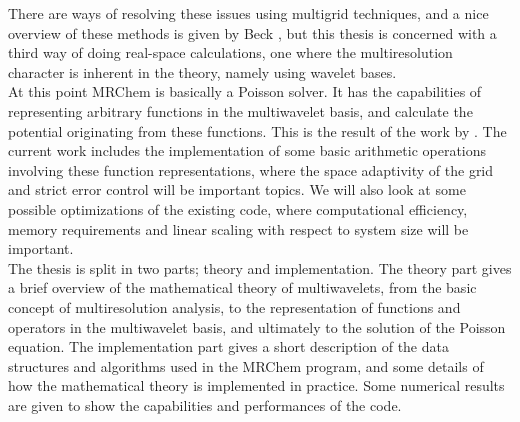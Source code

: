 \noindent
There are ways of resolving these issues using multigrid techniques, and a nice
overview of these methods is given by Beck \cite{Beck}, but this thesis is 
concerned with a third way of doing real-space calculations, one where the
multiresolution character is inherent in the theory, namely using wavelet
bases.\\

\noindent
At this point MRChem is basically a Poisson solver. It has the capabilities of 
representing arbitrary functions in the multiwavelet basis, and calculate the 
potential originating from these functions. This is the result of the work by
\cite{Fossgaard}. The current work includes the
implementation of some basic arithmetic operations involving these function
representations, where the space adaptivity of the grid and strict error
control will be important topics. We will also look at some possible 
optimizations of the existing code, where computational efficiency, memory
requirements and linear scaling with respect to system size will be important.
\\

\noindent
The thesis is split in two parts; theory and implementation. The theory part
gives a brief overview of the mathematical theory of multiwavelets, from the
basic concept of multiresolution analysis, to the representation of functions 
and operators in the multiwavelet basis, and ultimately to the solution of the
Poisson equation. The implementation part gives a short description of the
data structures and algorithms used in the MRChem program, and some details of
how the mathematical theory is implemented in practice. Some numerical results
are given to show the capabilities and performances of the code.


